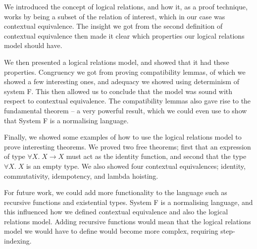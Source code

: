 \documentclass[a4paper, 11pt]{report}
\theoremstyle{definition}
\newcommand{\Tvar}{X}
\newcommand{\Tfunc}[2]{#1 \rightarrow #2}
\newcommand{\Tall}[2]{\forall #1.\; #2}
\begin{document}
We introduced the concept of logical relations, and how it, as a proof technique, works by being a subset of the relation of interest, which in our case was contextual equivalence. The insight we got from the second definition of contextual equivalence then made it clear which properties our logical relations model should have.

We then presented a logical relations model, and showed that it had these properties. Congruency we got from proving compatibility lemmas, of which we showed a few interesting ones, and adequacy we showed using determinism of system F. This then allowed us to conclude that the model was sound with respect to contextual equivalence. The compatibility lemmas also gave rise to the fundamental theorem – a very powerful result, which we could even use to show that System F is a normalising language.

Finally, we showed some examples of how to use the logical relations model to prove interesting theorems. We proved two free theorems; first that an expression of type $\Tall{\Tvar}{\Tfunc{\Tvar}{\Tvar}}$ must act as the identity function, and second that the type $\Tall{\Tvar}{\Tvar}$ is an empty type. We also showed four contextual equivalences; identity, commutativity, idempotency, and lambda hoisting.

For future work, we could add more functionality to the language such as recursive functions and existential types. System F is a normalising language, and this influenced how we defined contextual equivalence and also the logical relations model. Adding recursive functions would mean that the logical relations model we would have to define would become more complex, requiring step-indexing.


\cleardoublepage
{}
 



\cleardoublepage
\appendix
\end{document}
